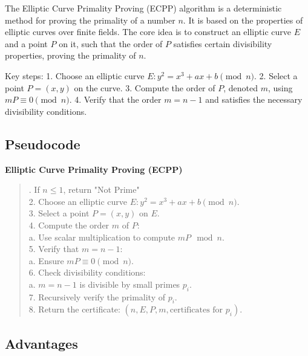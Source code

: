 \documentclass[12pt]{article}
\begin{document}
The Elliptic Curve Primality Proving (ECPP) algorithm is a deterministic method for proving the primality of a number \( n \). It is based on the properties of elliptic curves over finite fields. The core idea is to construct an elliptic curve \( E \) and a point \( P \) on it, such that the order of \( P \) satisfies certain divisibility properties, proving the primality of \( n \).

Key steps:
1. Choose an elliptic curve \( E: y^2 = x^3 + ax + b \pmod{n} \).
2. Select a point \( P = (x, y) \) on the curve.
3. Compute the order of \( P \), denoted \( m \), using \( mP \equiv 0 \pmod{n} \).
4. Verify that the order \( m = n - 1 \) and satisfies the necessary divisibility conditions.

\subsection*{Pseudocode}

\textbf{Elliptic Curve Primality Proving (ECPP)}


\begin{quote}. If \( n \leq 1 \), return "Not Prime" \\
2. Choose an elliptic curve \( E: y^2 = x^3 + ax + b \pmod{n} \). \\
3. Select a point \( P = (x, y) \) on \( E \). \\
4. Compute the order \( m \) of \( P \): \\
\hspace*{2em} a. Use scalar multiplication to compute \( mP \mod n \). \\
5. Verify that \( m = n - 1 \): \\
\hspace*{2em} a. Ensure \( mP \equiv 0 \pmod{n} \). \\
6. Check divisibility conditions: \\
\hspace*{2em} a. \( m = n - 1 \) is divisible by small primes \( p_i \). \\
7. Recursively verify the primality of \( p_i \). \\
8. Return the certificate: \( (n, E, P, m, \text{certificates for } p_i) \).
\end{quote}

\subsection*{Advantages}
\end{document}
